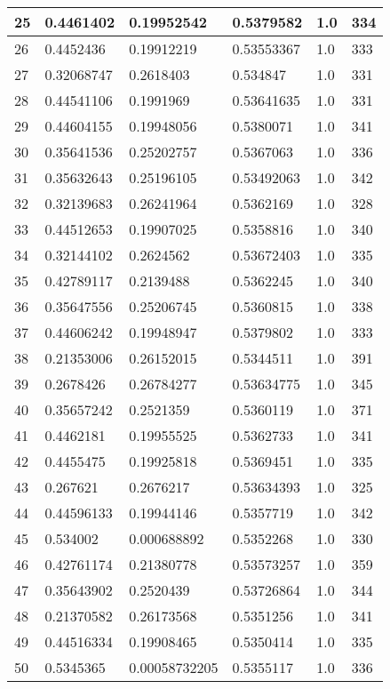 \begin{longtable}{|l|l|l|l|l|l|}
25 & 0.4461402 & 0.19952542 & 0.5379582 & 1.0 & 334 \\ \hline 
26 & 0.4452436 & 0.19912219 & 0.53553367 & 1.0 & 333 \\ \hline 
27 & 0.32068747 & 0.2618403 & 0.534847 & 1.0 & 331 \\ \hline 
28 & 0.44541106 & 0.1991969 & 0.53641635 & 1.0 & 331 \\ \hline 
29 & 0.44604155 & 0.19948056 & 0.5380071 & 1.0 & 341 \\ \hline 
30 & 0.35641536 & 0.25202757 & 0.5367063 & 1.0 & 336 \\ \hline 
31 & 0.35632643 & 0.25196105 & 0.53492063 & 1.0 & 342 \\ \hline 
32 & 0.32139683 & 0.26241964 & 0.5362169 & 1.0 & 328 \\ \hline 
33 & 0.44512653 & 0.19907025 & 0.5358816 & 1.0 & 340 \\ \hline 
34 & 0.32144102 & 0.2624562 & 0.53672403 & 1.0 & 335 \\ \hline 
35 & 0.42789117 & 0.2139488 & 0.5362245 & 1.0 & 340 \\ \hline 
36 & 0.35647556 & 0.25206745 & 0.5360815 & 1.0 & 338 \\ \hline 
37 & 0.44606242 & 0.19948947 & 0.5379802 & 1.0 & 333 \\ \hline 
38 & 0.21353006 & 0.26152015 & 0.5344511 & 1.0 & 391 \\ \hline 
39 & 0.2678426 & 0.26784277 & 0.53634775 & 1.0 & 345 \\ \hline 
40 & 0.35657242 & 0.2521359 & 0.5360119 & 1.0 & 371 \\ \hline 
41 & 0.4462181 & 0.19955525 & 0.5362733 & 1.0 & 341 \\ \hline 
42 & 0.4455475 & 0.19925818 & 0.5369451 & 1.0 & 335 \\ \hline 
43 & 0.267621 & 0.2676217 & 0.53634393 & 1.0 & 325 \\ \hline 
44 & 0.44596133 & 0.19944146 & 0.5357719 & 1.0 & 342 \\ \hline 
45 & 0.534002 & 0.000688892 & 0.5352268 & 1.0 & 330 \\ \hline 
46 & 0.42761174 & 0.21380778 & 0.53573257 & 1.0 & 359 \\ \hline 
47 & 0.35643902 & 0.2520439 & 0.53726864 & 1.0 & 344 \\ \hline 
48 & 0.21370582 & 0.26173568 & 0.5351256 & 1.0 & 341 \\ \hline 
49 & 0.44516334 & 0.19908465 & 0.5350414 & 1.0 & 335 \\ \hline 
50 & 0.5345365 & 0.00058732205 & 0.5355117 & 1.0 & 336 \\ \hline 
\end{longtable}